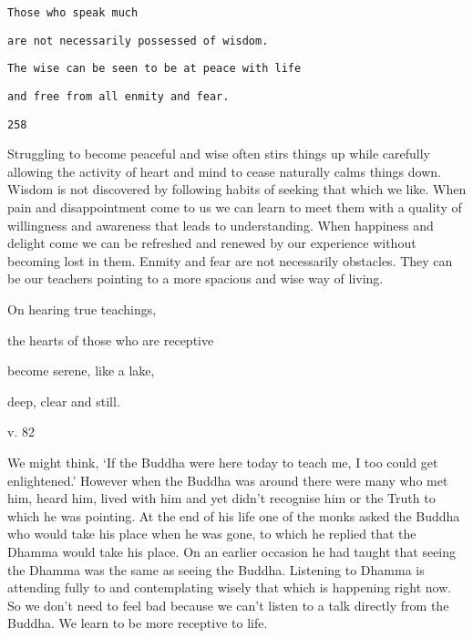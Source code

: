 \documentclass[a4paper,portrait,12pt]{article}
\begin{document}
\texttt{Those who speak much}

\texttt{are not necessarily possessed of wisdom.}

\texttt{The wise can be seen to be at peace with life}

\texttt{and free from all enmity and fear.}

\texttt{}

\texttt{258}




Struggling to become peaceful and wise often stirs things up while carefully allowing the activity of heart and mind to cease naturally calms things down. Wisdom is not discovered by following habits of seeking that which we like. When pain and disappointment come to us we can learn to meet them with a quality of willingness and awareness that leads to understanding. When happiness and delight come we can be refreshed and renewed by our experience without becoming lost in them. Enmity and fear are not necessarily obstacles. They can be our teachers pointing to a more spacious and wise way of living.











On hearing true teachings,


the hearts of those who are receptive


become serene, like a lake, 


deep, clear and still. 





v. 82 





We might think, `If the Buddha were here today to teach me, I too could get enlightened.' However when the Buddha was around there were many who met him, heard him, lived with him and yet didn't recognise him or the Truth to which he was pointing. At the end of his life one of the monks asked the Buddha who would take his place when he was gone, to which he replied that the Dhamma would take his place. On an earlier occasion he had taught that seeing the Dhamma was the same as seeing the Buddha. Listening to Dhamma is attending fully to and contemplating wisely that which is happening right now. So we don't need to feel bad because we can't listen to a talk directly from the Buddha. We learn to be more receptive to life.
\end{document}
